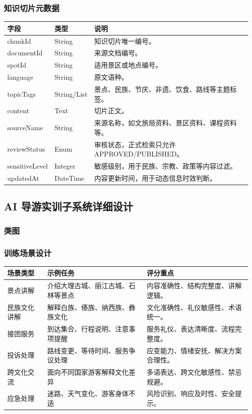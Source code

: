 \subsubsection{知识切片元数据}

\begin{longtable}{p{3cm}p{3.4cm}p{6.6cm}}
\toprule
字段 & 类型 & 说明 \\
\midrule
chunkId & String & 知识切片唯一编号。 \\
documentId & String & 来源文档编号。 \\
spotId & String & 适用景区或地点编号。 \\
language & String & 原文语种。 \\
topicTags & String/List & 景点、民族、节庆、非遗、饮食、路线等主题标签。 \\
content & Text & 切片正文。 \\
sourceName & String & 来源名称，如文旅局资料、景区资料、课程资料等。 \\
reviewStatus & Enum & 审核状态，正式检索只允许 APPROVED/PUBLISHED。 \\
sensitiveLevel & Integer & 敏感级别，用于民族、宗教、政策等内容过滤。 \\
updatedAt & DateTime & 内容更新时间，用于动态信息时效判断。 \\
\bottomrule
\end{longtable}

\subsection{AI 导游实训子系统详细设计}

\subsubsection{类图}

\newpage
\subsubsection{训练场景设计}

\begin{longtable}{p{2.8cm}p{4cm}p{6.3cm}}
\toprule
场景类型 & 示例任务 & 评分重点 \\
\midrule
景点讲解 & 介绍大理古城、丽江古城、石林等景点 & 内容准确性、结构完整度、讲解逻辑。 \\
民族文化讲解 & 解释白族、傣族、纳西族、彝族文化 & 文化准确性、礼仪敏感性、术语统一。 \\
接团服务 & 到达集合、行程说明、注意事项提醒 & 服务礼仪、表达清晰度、流程完整度。 \\
投诉处理 & 路线变更、等待时间、服务争议处理 & 应变能力、情绪安抚、解决方案合理性。 \\
跨文化交流 & 面向不同国家游客解释文化差异 & 多语表达、跨文化敏感性、禁忌规避。 \\
应急处理 & 迷路、天气变化、游客身体不适 & 风险识别、响应及时性、安全提示。 \\
\bottomrule
\end{longtable}

